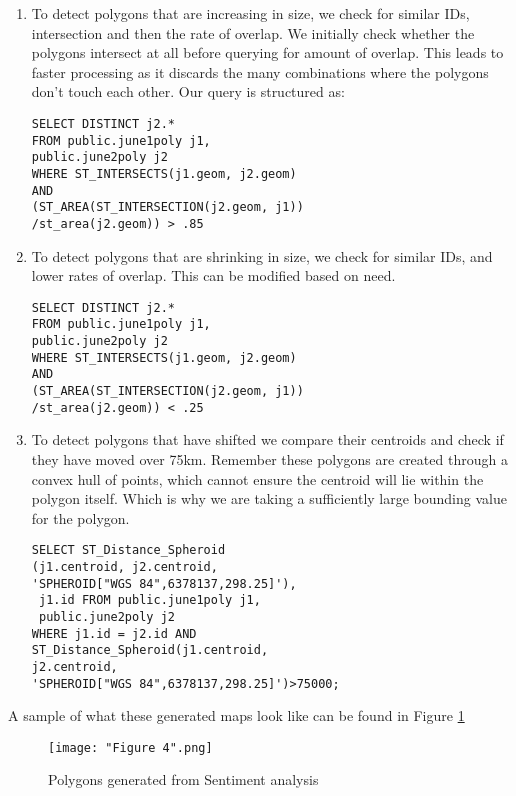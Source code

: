 \documentclass[conference]{IEEEtran}
\begin{document}
\begin{enumerate}
	\item To detect polygons that are increasing in size, we check for similar IDs, intersection and then the rate of overlap. We initially check whether the polygons intersect at all before querying for amount of overlap. This leads to faster processing as it discards the many combinations where the polygons don't touch each other. Our query is structured as:
\begin{lstlisting}
SELECT DISTINCT j2.* 
FROM public.june1poly j1,
public.june2poly j2 
WHERE ST_INTERSECTS(j1.geom, j2.geom)
AND  
(ST_AREA(ST_INTERSECTION(j2.geom, j1))
/st_area(j2.geom)) > .85
\end{lstlisting}

	\item To detect polygons that are shrinking  in size, we check for similar IDs, and lower rates of overlap. This can be modified based on need.
\begin{lstlisting}
SELECT DISTINCT j2.* 
FROM public.june1poly j1,
public.june2poly j2 
WHERE ST_INTERSECTS(j1.geom, j2.geom)
AND  
(ST_AREA(ST_INTERSECTION(j2.geom, j1))
/st_area(j2.geom)) < .25
\end{lstlisting}	

	\item To detect polygons that have shifted we compare their centroids and check if they have moved over 75km. Remember these polygons are created through a convex hull of points, which cannot ensure the centroid will lie within the polygon itself. Which is why we are taking a sufficiently large bounding value for the polygon.
\begin{lstlisting}
SELECT ST_Distance_Spheroid
(j1.centroid, j2.centroid, 
'SPHEROID["WGS 84",6378137,298.25]'), 
 j1.id FROM public.june1poly j1, 
 public.june2poly j2 
WHERE j1.id = j2.id AND 
ST_Distance_Spheroid(j1.centroid, 
j2.centroid, 
'SPHEROID["WGS 84",6378137,298.25]')>75000;
\end{lstlisting}	

\end{enumerate}

A sample of what these generated maps look like can be found in Figure \ref{Figure 5}

\begin{figure}[ht]
\centerline{\texttt{[image: "Figure 4".png]}}
\caption{Polygons generated from Sentiment analysis}
\label{Figure 5}
\end{figure}
\end{document}
